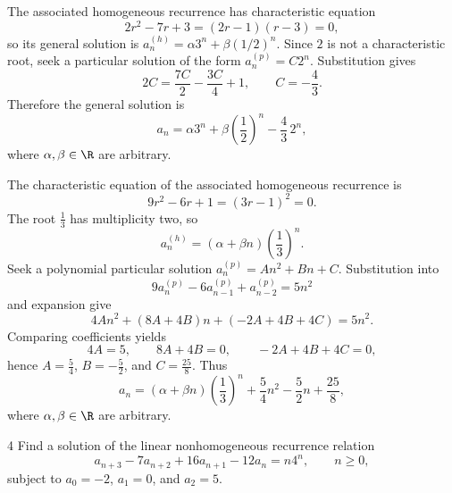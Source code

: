 \documentclass[11pt,oneside]{article}
\begin{document}
\begin{solution}
\begin{problemsubparts}
    \item The associated homogeneous recurrence has characteristic equation
    \[
        2r^2-7r+3=(2r-1)(r-3)=0,
    \]
    so its general solution is $a_n^{(h)}=\alpha3^n+\beta(1/2)^n$.
    Since $2$ is not a characteristic root, seek a particular solution of the form $a_n^{(p)}=C2^n$. Substitution gives
    \[
        2C=\frac{7C}{2}-\frac{3C}{4}+1,
        \qquad C=-\frac43.
    \]
    Therefore the general solution is
    \[
        a_n=\alpha3^n+\beta\left(\frac12\right)^n-\frac43\,2^n,
    \]
    where $\alpha,\beta\in\R$ are arbitrary.

    \item The characteristic equation of the associated homogeneous recurrence is
    \[
        9r^2-6r+1=(3r-1)^2=0.
    \]
    The root $\frac13$ has multiplicity two, so
    \[
        a_n^{(h)}=(\alpha+\beta n)\left(\frac13\right)^n.
    \]
    Seek a polynomial particular solution $a_n^{(p)}=An^2+Bn+C$. Substitution into
    \[
        9a_n^{(p)}-6a_{n-1}^{(p)}+a_{n-2}^{(p)}=5n^2
    \]
    and expansion give
    \[
        4An^2+(8A+4B)n+(-2A+4B+4C)=5n^2.
    \]
    Comparing coefficients yields
    \[
        4A=5,\qquad 8A+4B=0,\qquad -2A+4B+4C=0,
    \]
    hence $A=\frac54$, $B=-\frac52$, and $C=\frac{25}{8}$. Thus
    \[
        a_n=(\alpha+\beta n)\left(\frac13\right)^n
            +\frac54n^2-\frac52n+\frac{25}{8},
    \]
    where $\alpha,\beta\in\R$ are arbitrary.
\end{problemsubparts}
\end{solution}

\begin{problem}{4}
Find a solution of the linear nonhomogeneous recurrence relation
\[
    a_{n+3}-7a_{n+2}+16a_{n+1}-12a_n=n4^n,
    \qquad n\geq0,
\]
subject to $a_0=-2$, $a_1=0$, and $a_2=5$.
\end{problem}
\end{document}
